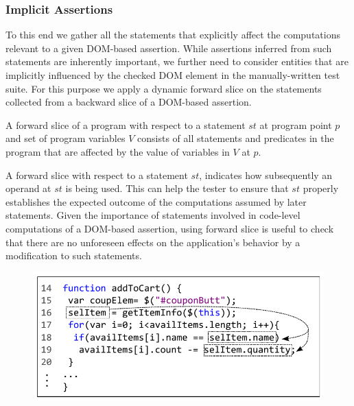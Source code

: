 \subsubsection{Implicit Assertions} \label{Sec:implicitAssertions}
To this end we gather all the statements that explicitly affect the computations relevant to a given DOM-based assertion. While assertions inferred from such statements are inherently important, we further need to consider entities that are implicitly influenced by the checked DOM element in the manually-written test suite. For this purpose we apply a dynamic forward slice on the statements collected from a backward slice of a DOM-based assertion.
\begin{mydef}
\label{def:forwardSlicing} 
A forward slice of a program with respect to a statement $st$ at program point $p$ and set of program variables $V$ consists of all statements and predicates in the program that are affected by the value of variables in $V$ at $p$.
\end{mydef}
A forward slice with respect to a statement $st$,
indicates how subsequently an operand at $st$ is being used. This can help the tester to ensure that $st$ properly establishes the expected outcome of the computations assumed by later statements. 
Given the importance of statements involved in code-level computations of a DOM-based assertion, using forward slice is useful to check that there are no unforeseen effects on the application's behavior by a modification to such statements. 

\begin{figure}[!t]
  \centering
  \includegraphics[width=1\hsize]{fig/forwardSlicingExample}
  \vspace{-0.1in} 
  \label{Fig:forwardSlicingExample}
  \vspace{-0.1in} 
\end{figure}

